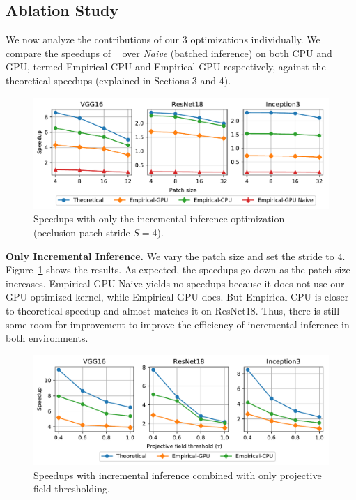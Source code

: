 \vspace{-2mm}
\subsection{Ablation Study}
We now analyze the contributions of our 3 optimizations individually. We compare the speedups of \system~ over \textit{Naive} (batched inference) on both CPU and GPU, termed  Empirical-CPU and Empirical-GPU respectively, against the theoretical speedups (explained in Sections 3 and 4).

\begin{figure}[t]
\includegraphics[width=\columnwidth]{images/5_2_1_edited}
\vspace{-8mm}
\caption{Speedups with only the incremental inference optimization (occlusion patch stride $S=4$).}
\vspace{-2mm}
\label{fig:5_2_1_edited}
\end{figure}

\vspace{2mm}
\noindent \textbf{Only Incremental Inference.} 
We vary the patch size and set the stride to $4$. Figure~\ref{fig:5_2_1_edited} shows the results. As expected, the speedups go down as the patch size increases. Empirical-GPU Naive yields no speedups because it does not use our GPU-optimized kernel, while Empirical-GPU does. But Empirical-CPU is closer to theoretical speedup and almost matches it on ResNet18. Thus, there is still some room for improvement to improve the efficiency of incremental inference in both environments.


\begin{figure}[t]
\includegraphics[width=\columnwidth]{images/5_2_2_edited}
\vspace{-8mm}
\caption{Speedups with incremental inference combined with only projective field thresholding.}
\vspace{-2mm}
\label{fig:5_2_2_edited}
\end{figure}

